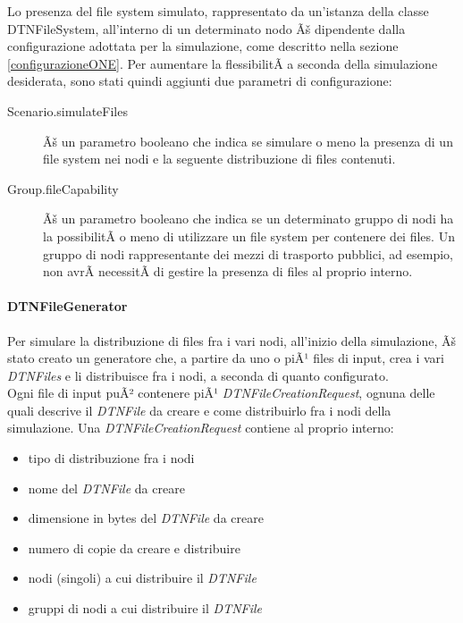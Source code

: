 Lo presenza del file system simulato, rappresentato da un'istanza della classe DTNFileSystem, all'interno di un determinato nodo Ãš dipendente dalla configurazione adottata per la simulazione, come descritto nella sezione \ref{configurazioneONE}. Per aumentare la flessibilitÃ  a seconda della simulazione desiderata, sono stati quindi aggiunti due parametri di configurazione:
\begin{description}
\item[Scenario.simulateFiles] Ãš un parametro booleano che indica se simulare o meno la presenza di un file system nei nodi e la seguente distribuzione di files contenuti.
\item[Group.fileCapability] Ãš un parametro booleano che indica se un determinato gruppo di nodi ha la possibilitÃ  o meno di utilizzare un file system per contenere dei files. Un gruppo di nodi rappresentante dei mezzi di trasporto pubblici, ad esempio, non avrÃ  necessitÃ  di gestire la presenza di files al proprio interno.
\end{description}

\paragraph{DTNFileGenerator}
Per simulare la distribuzione di files fra i vari nodi, all'inizio della simulazione, Ãš stato creato un generatore che, a partire da uno o piÃ¹ files di input, crea i vari \textit{DTNFiles} e li distribuisce fra i nodi, a seconda di quanto configurato.
\\
Ogni file di input puÃ² contenere piÃ¹ \textit{DTNFileCreationRequest}, ognuna delle quali descrive il \textit{DTNFile} da creare e come distribuirlo fra i nodi della simulazione. Una \textit{DTNFileCreationRequest} contiene al proprio interno:
\begin{itemize}
\item tipo di distribuzione fra i nodi
\item nome del \textit{DTNFile} da creare
\item dimensione in bytes del \textit{DTNFile} da creare
\item numero di copie da creare e distribuire
\item nodi (singoli) a cui distribuire il \textit{DTNFile}
\item gruppi di nodi a cui distribuire il \textit{DTNFile}
\end{itemize}

